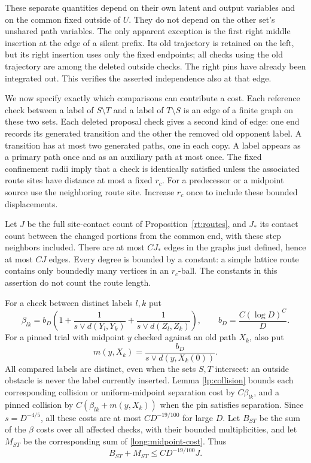 These separate quantities depend on their own latent and output variables
and on the common fixed outside of $U$.  They do not depend on the other
set's unshared path variables.  The only apparent exception is the first
right middle insertion at the edge of a silent prefix.  Its old trajectory
is retained on the left, but its right insertion uses only the fixed
endpoints; all checks using the old trajectory are among the deleted
outside checks.  The right pins have already been integrated out.
This verifies the asserted independence also at that edge.

We now specify exactly which comparisons can contribute a cost.  Each
reference check between a label of $S\setminus T$ and a label of
$T\setminus S$ is an edge of a finite graph on these two sets.  Each
deleted proposal check gives a second kind of edge: one end records its
generated transition and the other the removed old opponent label.  A
transition has at most two generated paths, one in each copy.  A label
appears as a primary path once and as an auxiliary path at most once.
The fixed confinement radii imply that a check is identically satisfied
unless the associated route sites have distance at most a fixed $r_c$.
For a predecessor or a midpoint source use the neighboring route site.
Increase $r_c$ once to include these bounded displacements.

Let $J$ be the full site-contact count of Proposition~\ref{rt:routes}, and
$J_*$ its contact count between the changed portions from the common end,
with these step neighbors included.  There are at most $CJ_*$ edges in the
graphs just defined, hence at most $CJ$ edges.  Every degree is bounded by
a constant: a simple lattice route contains only boundedly many vertices
in an $r_c$-ball.  The constants in this assertion do not count the route
length.

For a check between distinct labels $l,k$ put
\begin{equation}\label{long:beta}
 \beta_{lk}=b_D\left(1+\frac1{s\vee d(Y_l,Y_k)}
                       +\frac1{s\vee d(Z_l,Z_k)}\right),
 \qquad b_D=\frac{C(\log D)^C}{D}.
\end{equation}
For a pinned trial with midpoint $y$ checked against an old path $X_k$, also
put
\begin{equation}\label{long:midpoint-cost}
                 m(y,X_k)=\frac{b_D}{s\vee d(y,X_k(0))}.
\end{equation}
All compared labels are distinct, even when the sets $S,T$ intersect:
an outside obstacle is never the label currently inserted.  Lemma
\ref{lp:collision} bounds each corresponding collision or uniform-midpoint
separation cost by $C\beta_{lk}$, and a pinned collision by
$C(\beta_{lk}+m(y,X_k))$ when the pin satisfies separation.  Since
$s=D^{-4/5}$, all these costs are at most $CD^{-19/100}$ for large $D$.
Let $B_{ST}$ be the sum of the $\beta$ costs over all affected checks,
with their bounded multiplicities, and let $M_{ST}$ be the corresponding
sum of \eqref{long:midpoint-cost}.  Thus
\begin{equation}\label{long:worst-cost}
      B_{ST}+M_{ST}\le C D^{-19/100}J.
\end{equation}


